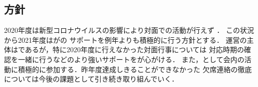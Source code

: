 \subsection*{\newGradeIfKouki{}\thirdGrade{}方針}


2020年度は新型コロナウイルスの影響により対面での活動が行えず
．
この状況から2021年度は\newGradeIfKouki{}\thirdGrade{}が\newGradeIfKouki{}\secondGrade{}の
サポートを例年よりも積極的に行う方針とする．
運営の主体は\newGradeIfKouki{}\secondGrade{}であるが，特に2020年度に行えなかった対面行事については
対応時期の確認を一緒に行うなどのより強いサポートを\newGradeIfKouki{}\thirdGrade{}が心がける．
また，\newGradeIfKouki{}\thirdGrade{}として会内の活動に積極的に参加する．昨年度達成しきることができなかった
欠席連絡の徹底については今後の課題として引き続き取り組んでいく．


